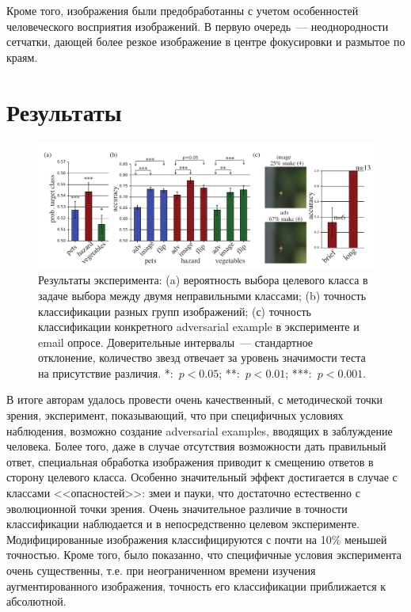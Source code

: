 \documentclass[a4paper,12pt]{article}
\begin{document}
Кроме того, изображения были предобработанны с учетом особенностей человеческого восприятия изображений. В первую очередь~--- неоднородности сетчатки, дающей более резкое изображение в центре фокусировки и размытое по краям. 

\section{Результаты}

\begin{figure}[h]
\centering
\includegraphics[width=0.99\linewidth]{results.png}
\caption{Результаты эксперимента: (a) вероятность выбора целевого класса в задаче выбора между двумя неправильными классами; (b) точность классификации разных групп изображений; (с) точность классификации конкретного adversarial example в эксперименте и email опросе. Доверительные интервалы~--- стандартное отклонение, количество звезд отвечает за уровень значимости теста на присутствие различия. *:~$p < 0.05$; **:~$p < 0.01$; ***:~$p < 0.001$.}
\label{fig:results}
\end{figure}

В итоге авторам удалось провести очень качественный, с методической точки зрения, эксперимент, показывающий, что при специфичных условиях наблюдения, возможно создание adversarial examples, вводящих в заблуждение человека. Более того, даже в случае отсутствия возможности дать правильный ответ, специальная обработка изображения приводит к смещению ответов в сторону целевого класса. Особенно значительный эффект достигается в случае с классами <<опасностей>>: змеи и пауки, что достаточно естественно с эволюционной точки зрения. Очень значительное различие в точности классификации наблюдается и в непосредственно целевом эксперименте. Модифицированные изображения классифицируются с почти на 10\% меньшей точностью. Кроме того, было показанно, что специфичные условия эксперимента очень существенны, т.е. при неограниченном времени изучения аугментированного изображения, точность его классификации приближается к абсолютной.
\end{document}
